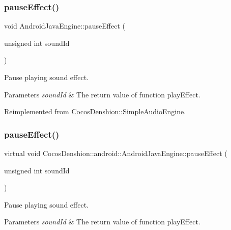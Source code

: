 \subsubsection{\texorpdfstring{pause\+Effect()}{pauseEffect()}\hspace{0.1cm}{\footnotesize\ttfamily [1/2]}}
{\footnotesize\ttfamily void Android\+Java\+Engine\+::pause\+Effect (\begin{DoxyParamCaption}\item[{unsigned int}]{sound\+Id }\end{DoxyParamCaption})\hspace{0.3cm}{\ttfamily [virtual]}}

Pause playing sound effect.


\begin{DoxyParams}{Parameters}
{\em sound\+Id} & The return value of function play\+Effect. \\
\hline
\end{DoxyParams}


Reimplemented from \hyperlink{classCocosDenshion_1_1SimpleAudioEngine_a44346159dae470e131ea1046aca63937}{Cocos\+Denshion\+::\+Simple\+Audio\+Engine}.

\mbox{\label{classCocosDenshion_1_1android_1_1AndroidJavaEngine_ad6ad4348ecf5003e359ec7beb79475b6}} 
\subsubsection{\texorpdfstring{pause\+Effect()}{pauseEffect()}\hspace{0.1cm}{\footnotesize\ttfamily [2/2]}}
{\footnotesize\ttfamily virtual void Cocos\+Denshion\+::android\+::\+Android\+Java\+Engine\+::pause\+Effect (\begin{DoxyParamCaption}\item[{unsigned int}]{sound\+Id }\end{DoxyParamCaption})\hspace{0.3cm}{\ttfamily [virtual]}}

Pause playing sound effect.


\begin{DoxyParams}{Parameters}
{\em sound\+Id} & The return value of function play\+Effect. \\
\hline
\end{DoxyParams}


